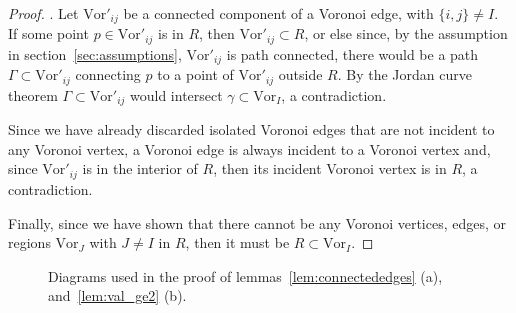 \documentclass[11pt]{article}
\newcommand{\Vor}{\text{Vor}}
\begin{document}
\begin{proof}
\vspace*{0.05in}.
Let $\Vor'_{ij}$ be a connected component of a Voronoi edge, with $\{i,j\}\ne I$. 
If some point $p\in\Vor'_{ij}$ is in $R$, 
	then $\Vor'_{ij}\subset R$, or else since, by the assumption in section~\ref{sec:assumptions}, 
	$\Vor'_{ij}$ is path connected, there would be a path $\Gamma\subset\Vor'_{ij}$ connecting 
	$p$ to a point of $\Vor'_{ij}$ outside $R$. 
By the Jordan curve theorem $\Gamma\subset\Vor'_{ij}$ would intersect $\gamma\subset\Vor_I$, a contradiction. 

Since we have already discarded isolated Voronoi edges that are not incident to any Voronoi vertex, 
	a Voronoi edge is always incident to a Voronoi vertex and, 
	since $\Vor'_{ij}$ is in the interior of $R$, then its incident Voronoi vertex is in $R$, 
	a contradiction. 

Finally, since we have shown that there cannot be any Voronoi vertices, edges, or regions $\Vor_J$
	with $J\ne I$ in $R$, then it must be $R\subset\Vor_I$. 
\end{proof}






























\begin{figure}[htbp]
   \centering
	\quad\quad\quad
   \caption{Diagrams used in the proof of lemmas~\ref{lem:connectededges} (a), 
   			and~\ref{lem:val_ge2} (b).}
\end{figure}
\end{document}
